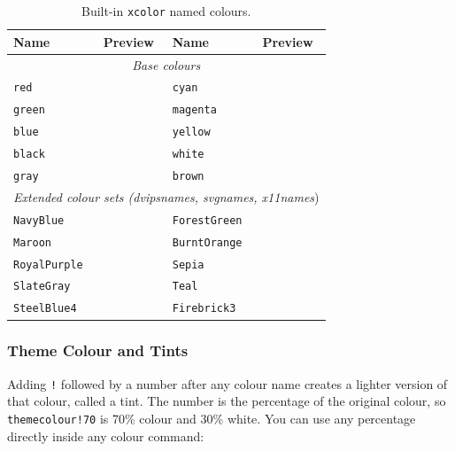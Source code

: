 \begin{table}[H]
	\centering
	\caption{Built-in \texttt{xcolor} named colours.}
	\label{tab:named-colours}
	\begin{tabular}{@{}llll@{}}
		\toprule
		Name & Preview & Name & Preview \\
		\midrule
		\multicolumn{4}{c}{\textit{Base colours}} \\
		\texttt{red}       	 & \colorbox{red}{\phantom{XXXXX}}       			& \texttt{cyan}      	 & \colorbox{cyan}{\phantom{XXXXX}}      \\
		\texttt{green}     	 & \colorbox{green}{\phantom{XXXXX}}     			& \texttt{magenta}     & \colorbox{magenta}{\phantom{XXXXX}}      \\
		\texttt{blue}   	 & \colorbox{blue}{\phantom{XXXXX}}   				& \texttt{yellow}    	 & \colorbox{yellow}{\phantom{XXXXX}}    \\
		\texttt{black}     	 & \colorbox{black}{\phantom{XXXXX}}     			& \texttt{white}     	 & \colorbox{white}{\phantom{XXXXX}}     \\
		\texttt{gray}  		 & \colorbox{gray}{\phantom{XXXXX}}  				& \texttt{brown}       & \colorbox{brown}{\phantom{XXXXX}}      \\
		\midrule
		\multicolumn{4}{c}{\textit{Extended colour sets (dvipsnames, svgnames, x11names})} \\
		\texttt{NavyBlue}    & \colorbox{NavyBlue}{\phantom{XXXXX}}      		& \texttt{ForestGreen} & \colorbox{ForestGreen}{\phantom{XXXXX}}     \\
		\texttt{Maroon}    	 & \colorbox{Maroon}{\phantom{XXXXX}}    			& \texttt{BurntOrange} & \colorbox{BurntOrange}{\phantom{XXXXX}}      \\
		\texttt{RoyalPurple} & \colorbox{RoyalPurple}{\phantom{XXXXX}}    		& \texttt{Sepia}       & \colorbox{Sepia}{\phantom{XXXXX}}      \\
		\texttt{SlateGray}   & \colorbox{SlateGray}{\phantom{XXXXX}}    		& \texttt{Teal}     	 & \colorbox{Teal}{\phantom{XXXXX}}     \\
		\texttt{SteelBlue4}	 & \colorbox{SteelBlue4}{\phantom{XXXXX}} 			& \texttt{Firebrick3}  & \colorbox{Firebrick3}{\phantom{XXXXX}}     \\
		\bottomrule
	\end{tabular}
\end{table}

\subsubsection{Theme Colour and Tints}
Adding \texttt{!} followed by a number after any colour name creates a lighter version of that colour, called a tint. The number is the percentage of the original colour, so \texttt{themecolour!70} is 70\% colour and 30\% white. You can use any percentage directly inside any colour command:


